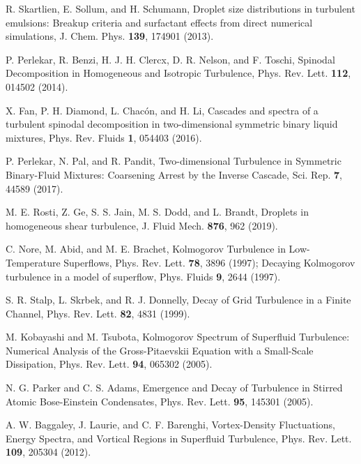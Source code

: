 \documentclass[12pt,a4paper]{jbook}
\begin{document}
\begin{thebibliography}{99}
        R. Skartlien, E. Sollum, and H. Schumann,
        Droplet size distributions in turbulent emulsions: Breakup criteria and
        surfactant effects from direct numerical simulations,
        J. Chem. Phys. \textbf{139}, 174901 (2013).

        P. Perlekar, R. Benzi, H. J. H. Clercx, D. R. Nelson, and F. Toschi,
        Spinodal Decomposition in Homogeneous and Isotropic Turbulence,
        Phys. Rev. Lett. \textbf{112}, 014502 (2014).

        X. Fan, P. H. Diamond, L. Chac\'on, and H. Li,
        Cascades and spectra of a turbulent spinodal decomposition
        in two-dimensional symmetric binary liquid mixtures,
        Phys. Rev. Fluids \textbf{1}, 054403 (2016).
          
        P. Perlekar, N. Pal, and R. Pandit,
        Two-dimensional Turbulence in Symmetric Binary-Fluid Mixtures:
        Coarsening Arrest by the Inverse Cascade,
        Sci. Rep. \textbf{7}, 44589 (2017).
        
        M. E. Rosti, Z. Ge, S. S. Jain, M. S. Dodd, and L. Brandt,
        Droplets in homogeneous shear turbulence,
        J. Fluid Mech. \textbf{876}, 962 (2019).

        C. Nore, M. Abid, and M. E. Brachet,
        Kolmogorov Turbulence in Low-Temperature Superflows,
        Phys. Rev. Lett. \textbf{78}, 3896 (1997);
        Decaying Kolmogorov turbulence in a model of superflow,  
        Phys. Fluids \textbf{9}, 2644 (1997).
        
        S. R. Stalp, L. Skrbek, and R. J. Donnelly,
        Decay of Grid Turbulence in a Finite Channel,
        Phys. Rev. Lett. \textbf{82}, 4831 (1999).
        
        M. Kobayashi and M. Tsubota,
        Kolmogorov Spectrum of Superfluid Turbulence: Numerical Analysis
        of the Gross-Pitaevskii Equation with a Small-Scale Dissipation,
        Phys. Rev. Lett. \textbf{94}, 065302 (2005).
        
        N. G. Parker and C. S. Adams,
        Emergence and Decay of Turbulence in Stirred Atomic Bose-Einstein
        Condensates,
        Phys. Rev. Lett. \textbf{95}, 145301 (2005).
        
        A. W. Baggaley, J. Laurie, and C. F. Barenghi,
        Vortex-Density Fluctuations, Energy Spectra, and Vortical Regions in
        Superfluid Turbulence,  
        Phys. Rev. Lett. \textbf{109}, 205304 (2012).
        

\end{thebibliography}
\end{document}
